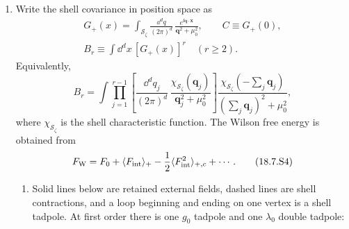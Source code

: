 \begin{enumerate}
\begin{enumerate}
    \item[(c)]
    Write the shell covariance in position space as
    \[
      \begin{gathered}
        G_+(x)=\int_{\mathcal S_\zeta}\frac{\dd^dq}{(2\pi)^d}\,
          \frac{e^{\ii\mathbf q\cdot\mathbf x}}
            {\mathbf q^2+\mu_0^2},
        \qquad C\equiv G_+(0),\\
        B_r\equiv\int \dd^dx\,[G_+(x)]^r\quad(r\geq2).
      \end{gathered}
      \tag{18.7.S2}
    \]
    Equivalently,
    \[
      B_r=\int\prod_{j=1}^{r-1}\left[
        \frac{\dd^dq_j}{(2\pi)^d}\,
        \frac{\chi_{\mathcal S_\zeta}(\mathbf q_j)}
             {\mathbf q_j^2+\mu_0^2}\right]
        \frac{\chi_{\mathcal S_\zeta}(-\sum_j\mathbf q_j)}
             {(\sum_j\mathbf q_j)^2+\mu_0^2},
      \tag{18.7.S3}
    \]
    where \(\chi_{\mathcal S_\zeta}\) is the shell characteristic
    function.  The Wilson free energy is obtained from
    \[
      F_{\rm W}=F_0+
        \langle F_{\rm int}\rangle_+
        -\frac12\langle F_{\rm int}^2\rangle_{+,c}+\cdots .
      \tag{18.7.S4}
    \]

    \begin{enumerate}
      \item[(i)]
      Solid lines below are retained external fields, dashed lines are
      shell contractions, and a loop beginning and ending on one vertex
      is a shell tadpole.  At first order there is one \(g_0\) tadpole and
      one \(\lambda_0\) double tadpole:
      \begin{center}
      \end{center}


\end{enumerate}
\end{enumerate}
\end{enumerate}
